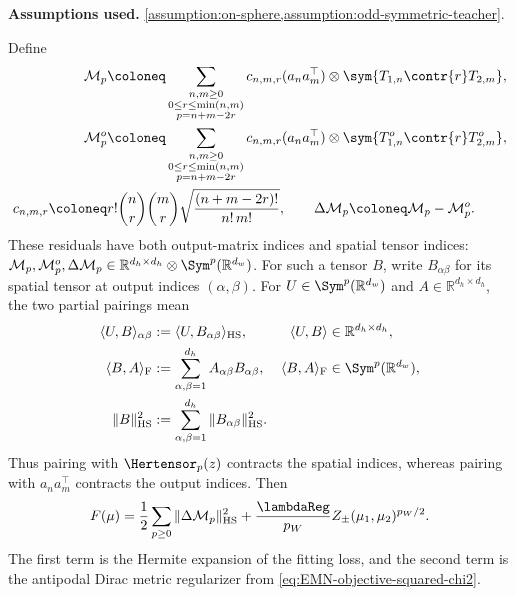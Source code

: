 \begin{lemma}
\label{lemma:EMN-expansion-F}
\textbf{Assumptions used.} \cref{assumption:on-sphere,assumption:odd-symmetric-teacher}.

Define
\begin{align}
    \mathcal M_p
    &\coloneq
    \sum_{\substack{n,m\ge 0\\ 0\le r\le \min(n,m)\\ p=n+m-2r}}
    c_{n,m,r}(a_n a_m^\top)\otimes \sym{T_{1,n}\contr{r} T_{2,m}},
    \\
    \mathcal M_p^o
    &\coloneq
    \sum_{\substack{n,m\ge 0\\ 0\le r\le \min(n,m)\\ p=n+m-2r}}
    c_{n,m,r}(a_n a_m^\top)\otimes \sym{T_{1,n}^o\contr{r} T_{2,m}^o},
    \\
    c_{n,m,r}
    \coloneq&
    r!\binom nr\binom mr
    \sqrt{\frac{(n+m-2r)!}{n!\,m!}},
    \qquad
    \Delta\mathcal M_p\coloneq \mathcal M_p-\mathcal M_p^o.
\end{align}
These residuals have both output-matrix indices and spatial tensor indices:
$\mathcal M_p,\mathcal M_p^o,\Delta\mathcal M_p
\in\mathbb R^{d_h\times d_h}\otimes\Sym^p(\mathbb R^{d_w})$.
For such a tensor $B$, write $B_{\alpha\beta}$ for its spatial tensor
at output indices $(\alpha,\beta)$. For $U\in\Sym^p(\mathbb R^{d_w})$
and $A\in\mathbb R^{d_h\times d_h}$, the two partial pairings mean
\begin{equation}
\label{eq:mf-matrix-tensor-partial-pairings}
\begin{aligned}
 \langle U,B\rangle_{\alpha\beta}
 &:=\langle U,B_{\alpha\beta}\rangle_{\rm HS},
 &\langle U,B\rangle&\in\mathbb R^{d_h\times d_h},\\
 \langle B,A\rangle_{\rm F}
 &:=\sum_{\alpha,\beta=1}^{d_h}A_{\alpha\beta}B_{\alpha\beta},
 &\langle B,A\rangle_{\rm F}&\in\Sym^p(\mathbb R^{d_w}),\\
 \|B\|_{\rm HS}^2
 &:=\sum_{\alpha,\beta=1}^{d_h}\|B_{\alpha\beta}\|_{\rm HS}^2.
\end{aligned}
\end{equation}
Thus pairing with $\Hertensor_p(z)$ contracts the spatial indices,
whereas pairing with $a_na_m^\top$ contracts the output indices.
Then
\begin{equation}
\label{eq:EMN-expanded-squared-chi2-objective}
    F(\mu)
    =
    \frac12\sum_{p\ge 0}\|\Delta\mathcal M_p\|_{\mathrm{HS}}^2
    +
    \frac{\lambdaReg}{p_W}Z_\pm(\mu_1,\mu_2)^{p_W/2}.
\end{equation}
The first term is the Hermite expansion of the fitting loss, and the second term is the antipodal Dirac metric regularizer from \eqref{eq:EMN-objective-squared-chi2}.
\end{lemma}

